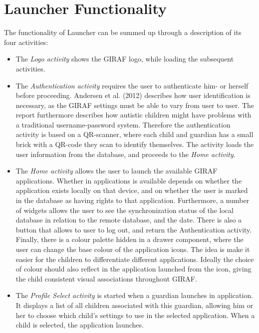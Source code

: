\section{Launcher Functionality}
The functionality of Launcher can be summed up through a description of its four activities:
\begin{itemize}
	\item The \textit{Logo activity} shows the GIRAF logo, while loading the subsequent activities.
	\item The \textit{Authentication activity} requires the user to authenticate him- or herself before proceeding. Andersen et al. (2012) describes how user identification is necessary, as the GIRAF settings must be able to vary from user to user. The report furthermore describes how autistic children might have problems with a traditional username-password system. Therefore the authentication activity is based on a QR-scanner, where each child and guardian has a small brick with a QR-code they scan to identify themselves. The activity loads the user information from the database, and proceeds to the \textit{Home activity}.
	\item The \textit{Home activity} allows the user to launch the available GIRAF applications. Whether in applications is available depends on whether the application exists locally on that device, and on whether the user is marked in the database as having rights to that application. Furthermore, a number of widgets allows the user to see the synchronization status of the local database in relation to the remote database, and the date. There is also a button that allows to user to log out, and return the Authentication activity. Finally, there is a colour palette hidden in a drawer component, where the user can change the base colour of the application icons. The idea is make it easier for the children to differentiate different applications. Ideally the choice of colour should also reflect in the application launched from the icon, giving the child consistent visual associations throughout GIRAF.
	\item The \textit{Profile Select activity} is started when a guardian launches in application. It displays a list of all children associated with this guardian, allowing him or her to choose which child's settings to use in the selected application. When a child is selected, the application launches.
\end{itemize}


